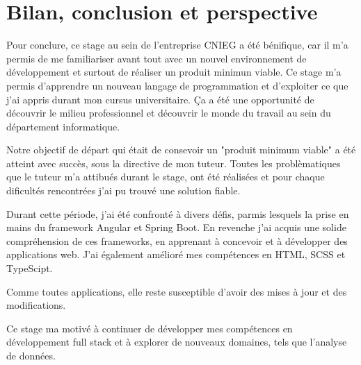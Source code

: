 \chapter*{Bilan, conclusion et perspective}

Pour conclure, ce stage au sein de l'entreprise CNIEG a été bénifique, car il m'a permis de me familiariser avant tout avec un nouvel environnement
de développement et surtout de réaliser un produit minimun viable. Ce stage m'a permis d'apprendre un nouveau langage de programmation et d'exploiter ce que j'ai appris 
durant mon cursus universitaire.
Ça a été une opportunité de découvrir le milieu professionnel et découvrir le monde du travail au sein du département informatique.
\medskip

Notre objectif de départ qui était de consevoir un "produit minimum viable" a été atteint avec succès, 
sous la directive de mon tuteur. Toutes les problèmatiques que le tuteur m'a attibués durant le stage, 
ont été réalisées et pour chaque dificultés rencontrées j'ai pu trouvé une solution fiable.\medskip

Durant cette période, j'ai été confronté à divers défis, parmis lesquels la prise en mains du framework Angular et Spring Boot. En revenche j'ai acquis une solide compréhension de ces frameworks, en apprenant à concevoir et à développer des applications web. J'ai également amélioré mes compétences en HTML, SCSS et TypeScipt. 
\medskip

Comme toutes applications, elle reste susceptible d'avoir des mises à jour et des 
modifications.\medskip

Ce stage ma motivé à continuer de développer mes compétences en développement full stack et à explorer de nouveaux domaines, tels que l'analyse de données.
\medskip


